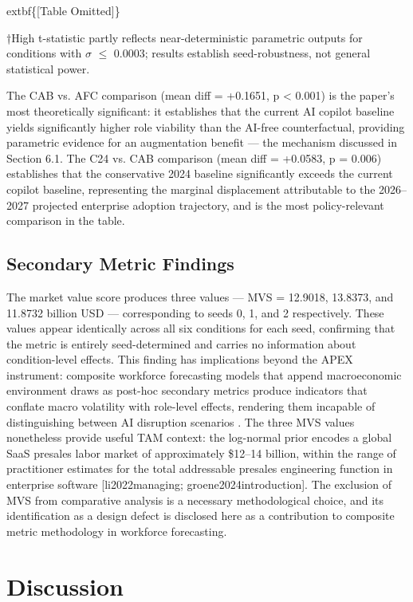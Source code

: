 \documentclass[10pt, conference]{IEEEtran}
\begin{document}
	extbf\{[Table Omitted]\}

†High t-statistic partly reflects near-deterministic parametric outputs for conditions with $\sigma$ $\leq$ 0.0003; results establish seed-robustness, not general statistical power.

The CAB vs. AFC comparison (mean diff = +0.1651, p < 0.001) is the paper's most theoretically significant: it establishes that the current AI copilot baseline yields significantly higher role viability than the AI-free counterfactual, providing parametric evidence for an augmentation benefit --- the mechanism discussed in Section 6.1. The C24 vs. CAB comparison (mean diff = +0.0583, p = 0.006) establishes that the conservative 2024 baseline significantly exceeds the current copilot baseline, representing the marginal displacement attributable to the 2026--2027 projected enterprise adoption trajectory, and is the most policy-relevant comparison in the table.

\subsection{Secondary Metric Findings}

\label{sec:secondary_metric_findings}

The market value score produces three values --- MVS = 12.9018, 13.8373, and 11.8732 billion USD --- corresponding to seeds 0, 1, and 2 respectively. These values appear identically across all six conditions for each seed, confirming that the metric is entirely seed-determined and carries no information about condition-level effects. This finding has implications beyond the APEX instrument: composite workforce forecasting models that append macroeconomic environment draws as post-hoc secondary metrics produce indicators that conflate macro volatility with role-level effects, rendering them incapable of distinguishing between AI disruption scenarios \cite{virtanen2020scipy}. The three MVS values nonetheless provide useful TAM context: the log-normal prior encodes a global SaaS presales labor market of approximately \$12--14 billion, within the range of practitioner estimates for the total addressable presales engineering function in enterprise software [li2022managing; groene2024introduction]. The exclusion of MVS from comparative analysis is a necessary methodological choice, and its identification as a design defect is disclosed here as a contribution to composite metric methodology in workforce forecasting.

\section{Discussion}
\end{document}
